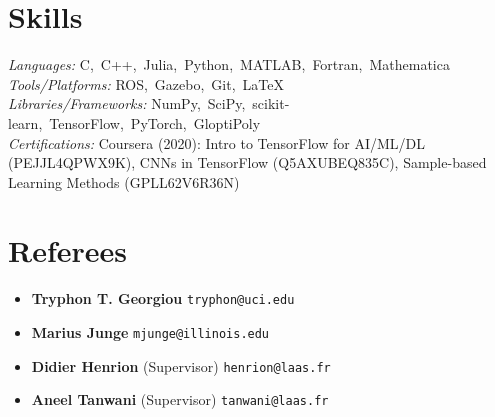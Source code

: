 \documentclass[letter]{res}
\begin{document}
\begin{resume}
\section{\textcolor{Bittersweet}{Skills}}
{\sl Languages:} C,~C++,~Julia,~Python,~MATLAB,~Fortran,~Mathematica \\
{\sl Tools/Platforms:} ROS,~Gazebo,~Git,~\LaTeX \\
{\sl Libraries/Frameworks:} NumPy,~SciPy,~scikit-learn,~TensorFlow,~PyTorch,~GloptiPoly \\
{\sl Certifications:} Coursera (2020): Intro to TensorFlow for AI/ML/DL (PEJJL4QPWX9K), CNNs in TensorFlow (Q5AXUBEQ835C), Sample-based Learning Methods (GPLL62V6R36N)

\section{\textcolor{Bittersweet}{Referees}}
\begin{itemize}
    \item \textbf{Tryphon T. Georgiou} \hfill \texttt{tryphon@uci.edu}
    \item \textbf{Marius Junge} \hfill \texttt{mjunge@illinois.edu}
    \item \textbf{Didier Henrion} (Supervisor) \hfill \texttt{henrion@laas.fr}
    \item \textbf{Aneel Tanwani} (Supervisor) \hfill \texttt{tanwani@laas.fr}
\end{itemize}

\end{resume}
\end{document}
